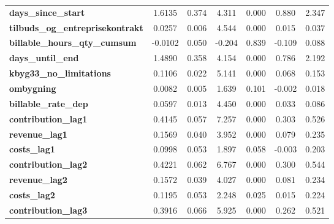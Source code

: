 \begin{center}
\begin{tabular}{lcccccc}
\textbf{days\_since\_start}                 &       1.6135  &        0.374     &     4.311  &         0.000        &        0.880    &        2.347     \\
\textbf{tilbuds\_og\_entreprisekontrakt}    &       0.0257  &        0.006     &     4.544  &         0.000        &        0.015    &        0.037     \\
\textbf{billable\_hours\_qty\_cumsum}       &      -0.0102  &        0.050     &    -0.204  &         0.839        &       -0.109    &        0.088     \\
\textbf{days\_until\_end}                   &       1.4890  &        0.358     &     4.154  &         0.000        &        0.786    &        2.192     \\
\textbf{kbyg33\_no\_limitations}            &       0.1106  &        0.022     &     5.141  &         0.000        &        0.068    &        0.153     \\
\textbf{ombygning}                          &       0.0082  &        0.005     &     1.639  &         0.101        &       -0.002    &        0.018     \\
\textbf{billable\_rate\_dep}                &       0.0597  &        0.013     &     4.450  &         0.000        &        0.033    &        0.086     \\
\textbf{contribution\_lag1}                 &       0.4145  &        0.057     &     7.257  &         0.000        &        0.303    &        0.526     \\
\textbf{revenue\_lag1}                      &       0.1569  &        0.040     &     3.952  &         0.000        &        0.079    &        0.235     \\
\textbf{costs\_lag1}                        &       0.0998  &        0.053     &     1.897  &         0.058        &       -0.003    &        0.203     \\
\textbf{contribution\_lag2}                 &       0.4221  &        0.062     &     6.767  &         0.000        &        0.300    &        0.544     \\
\textbf{revenue\_lag2}                      &       0.1572  &        0.039     &     4.027  &         0.000        &        0.081    &        0.234     \\
\textbf{costs\_lag2}                        &       0.1195  &        0.053     &     2.248  &         0.025        &        0.015    &        0.224     \\
\textbf{contribution\_lag3}                 &       0.3916  &        0.066     &     5.925  &         0.000        &        0.262    &        0.521     \\

\end{tabular}
\end{center}
